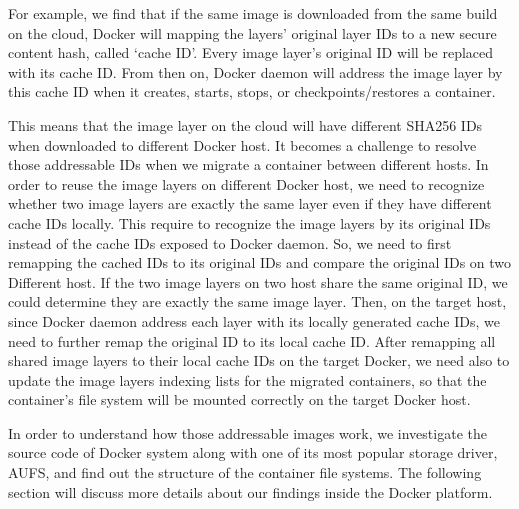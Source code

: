 For example, we find that 
if the same image is downloaded from the same build on the cloud, Docker will mapping the layers' original layer IDs to a new secure content hash, called `cache ID'. Every image layer's original ID will be replaced with its cache ID. From then on, Docker daemon will address the image layer by this cache ID when it creates, starts, stops, or checkpoints/restores a container. 

This means that
the image layer on the cloud will have different SHA256 IDs when downloaded to different Docker host. 
It becomes a challenge to resolve those addressable IDs when we migrate a container between different hosts. 
In order to reuse the image layers on different Docker host,
we need to recognize whether two image layers are exactly the same layer even if they have different cache IDs locally. 
This require to recognize the image layers by its original IDs instead of the cache IDs exposed to Docker daemon. So, we need to first remapping the cached IDs to its original IDs and compare the original IDs on two Different host. If the two image layers on two host share the same original ID, we could determine they are exactly the same image layer. Then, on the target host, since Docker daemon address each layer with its locally generated cache IDs, we need to further remap the original ID to its local cache ID.
After remapping all shared image layers to their local cache IDs on the target Docker, we need also to update the image layers indexing lists for the migrated containers, so that the container's file system will be mounted correctly on the target Docker host.



In order to understand how those addressable images work, we investigate the source code of Docker system along with one of its most popular storage driver, AUFS, and find out the structure of the container file systems. The following section will discuss more details about our findings inside the Docker platform.

